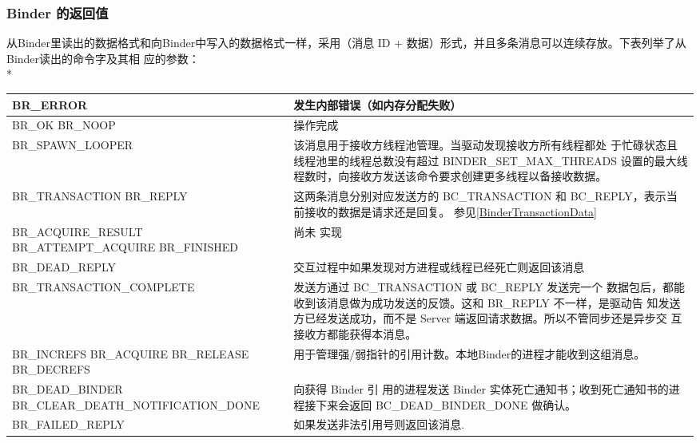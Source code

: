\documentclass[a4paper,11pt]{article}
\begin{document}
\subsubsection{Binder 的返回值}
从Binder里读出的数据格式和向Binder中写入的数据格式一样，采用（消息
ID + 数据）形式，并且多条消息可以连续存放。下表列举了从Binder读出的命令字及其相
应的参数：\\*
 \label{proto:binderreturn}
\begin{table}[ht]
\footnotesize
\begin{tabular}{|p{}|p{}|}\hline
    BR_ERROR & 发生内部错误（如内存分配失败） \\\hline

    BR_OK \newline BR_NOOP & 操作完成 \\\hline

    BR_SPAWN_LOOPER & 该消息用于接收方线程池管理。当驱动发现接收方所有线程都处
    于忙碌状态且线程池里的线程总数没有超过 BINDER_SET_MAX_THREADS
    设置的最大线程数时，向接收方发送该命令要求创建更多线程以备接收数据。
    \\\hline

    BR_TRANSACTION \newline BR_REPLY & 这两条消息分别对应发送方的
    BC_TRANSACTION 和 BC_REPLY，表示当前接收的数据是请求还是回复。
    参见\autoref{BinderTransactionData}\\\hline

    BR_ACQUIRE_RESULT \newline BR_ATTEMPT_ACQUIRE \newline BR_FINISHED & 尚未
    实现 \\\hline

    BR_DEAD_REPLY & 交互过程中如果发现对方进程或线程已经死亡则返回该消息
    \\\hline

    BR_TRANSACTION_COMPLETE & 发送方通过 BC_TRANSACTION 或 BC_REPLY 发送完一个
    数据包后，都能收到该消息做为成功发送的反馈。这和 BR_REPLY 不一样，是驱动告
    知发送方已经发送成功，而不是 Server 端返回请求数据。所以不管同步还是异步交
    互接收方都能获得本消息。\\\hline

    BR_INCREFS \newline  BR_ACQUIRE \newline BR_RELEASE \newline BR_DECREFS \newline
    & 用于管理强/弱指针的引用计数。本地Binder的进程才能收到这组消息。\\\hline

   BR_DEAD_BINDER \newline BR_CLEAR_DEATH_NOTIFICATION_DONE & 向获得 Binder 引
   用的进程发送 Binder 实体死亡通知书；收到死亡通知书的进程接下来会返回
   BC_DEAD_BINDER_DONE 做确认。\\\hline
   BR_FAILED_REPLY & 如果发送非法引用号则返回该消息. \\\hline
\end{tabular}
\end{table}
\end{document}
